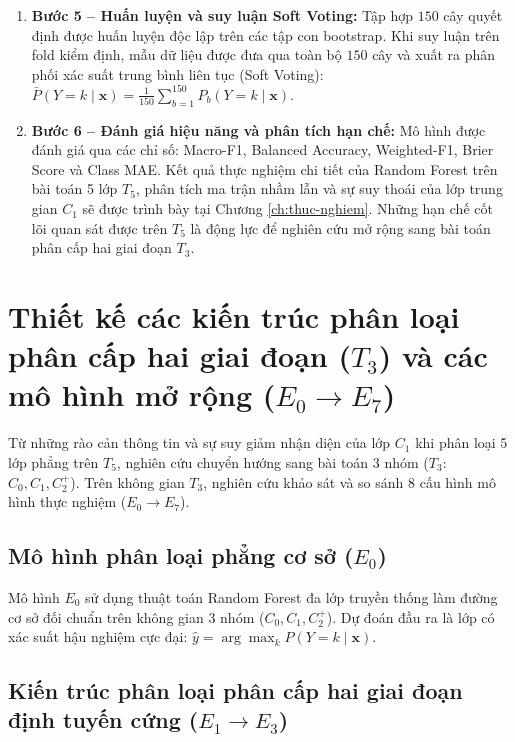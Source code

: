 \begin{enumerate}
    \item \textbf{Bước 5 -- Huấn luyện và suy luận Soft Voting:} 
    Tập hợp $150$ cây quyết định được huấn luyện độc lập trên các tập con bootstrap. Khi suy luận trên fold kiểm định, mẫu dữ liệu được đưa qua toàn bộ $150$ cây và xuất ra phân phối xác suất trung bình liên tục (Soft Voting): $\bar{P}(Y = k \mid \mathbf{x}) = \frac{1}{150}\sum_{b=1}^{150} P_b(Y = k \mid \mathbf{x})$.
    
    \item \textbf{Bước 6 -- Đánh giá hiệu năng và phân tích hạn chế:} 
    Mô hình được đánh giá qua các chỉ số: Macro-F1, Balanced Accuracy, Weighted-F1, Brier Score và Class MAE. Kết quả thực nghiệm chi tiết của Random Forest trên bài toán 5 lớp $T_5$, phân tích ma trận nhầm lẫn và sự suy thoái của lớp trung gian $C_1$ sẽ được trình bày tại Chương \ref{ch:thuc-nghiem}. Những hạn chế cốt lõi quan sát được trên $T_5$ là động lực để nghiên cứu mở rộng sang bài toán phân cấp hai giai đoạn $T_3$.
\end{enumerate}

\section{Thiết kế các kiến trúc phân loại phân cấp hai giai đoạn ($T_3$) và các mô hình mở rộng ($E_0 \to E_7$)}
\label{sec:thiet-ke-kien-truc-mo-hinh}

Từ những rào cản thông tin và sự suy giảm nhận diện của lớp $C_1$ khi phân loại 5 lớp phẳng trên $T_5$, nghiên cứu chuyển hướng sang bài toán 3 nhóm ($T_3$: $C_0, C_1, C_2^+$). Trên không gian $T_3$, nghiên cứu khảo sát và so sánh 8 cấu hình mô hình thực nghiệm ($E_0 \to E_7$).

\subsection{Mô hình phân loại phẳng cơ sở ($E_0$)}
\label{subsec:e0-flat}

Mô hình $E_0$ sử dụng thuật toán Random Forest đa lớp truyền thống làm đường cơ sở đối chuẩn trên không gian 3 nhóm ($C_0, C_1, C_2^+$). Dự đoán đầu ra là lớp có xác suất hậu nghiệm cực đại: $\hat{y} = \arg\max_k P(Y=k \mid \mathbf{x})$.

\subsection{Kiến trúc phân loại phân cấp hai giai đoạn định tuyến cứng ($E_1 \to E_3$)}
\label{subsec:hard-hierarchical}

